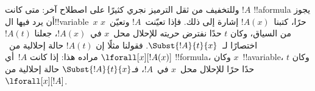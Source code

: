 \documentclass[../../../include/open-logic-section]{subfiles}
\begin{document}
وللتخفيف من ثقل الترميز نجري كثيرًا على اصطلاح آخر: متى كانت
$!A$ !!a{formula} يجوز أن يرد فيها ال!!{variable}~$x$ حرًا،
كتبنا~$!A(x)$ إشارة إلى ذلك. فإذا تعيّنت~$!A$ وتعيّن~$x$ من السياق،
وكان $t$ حدًا نفترض حريته للإحلال محل~$x$ في~$!A(x)$، جعلنا
$!A(t)$ اختصارًا لـ~$\Subst{!A}{t}{x}$. فقولنا مثلًا إن
$!A(t)$ حالة إحلالية من~$\lforall[x][!A(x)]$ مراده هذا:
إذا كانت $!A$~أي !!{formula}، وكان $x$~!!a{variable}، وكان $t$~حدًا
حرًا للإحلال محل~$x$ في~$!A$، فـ$\Subst{!A}{t}{x}$ حالة إحلالية
من~$\lforall[x][!A]$.
\end{document}
